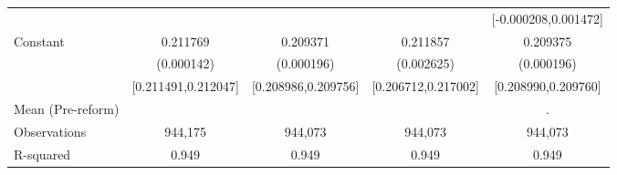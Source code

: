 {\begin{tabular}{l*{4}{c}}
                    &                     &                     &                     &[-0.000208,0.001472]         \\
Constant            &    0.211769\sym{***}&    0.209371\sym{***}&    0.211857\sym{***}&    0.209375\sym{***}\\
                    &  (0.000142)         &  (0.000196)         &  (0.002625)         &  (0.000196)         \\
                    &[0.211491,0.212047]         &[0.208986,0.209756]         &[0.206712,0.217002]         &[0.208990,0.209760]         \\
\midrule
Mean (Pre-reform)   &                     &                     &                     &           .         \\
Observations        &     944,175         &     944,073         &     944,073         &     944,073         \\
R-squared           &       0.949         &       0.949         &       0.949         &       0.949         \\
\bottomrule
\end{tabular}
}
